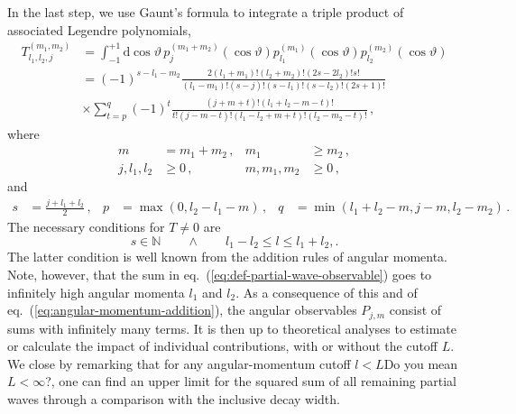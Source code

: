 \documentclass[aps,prd,reprint,nofootinbib,preprintnumbers]{revtex4}
\newcommand{\refeq}[1]{eq.~(\ref{eq:#1})}
\newcommand{\rmdx}[1]{\mbox{d} #1 \,} %
\renewcommand{\theta}{\vartheta}
\newcommand{\fred}[1]{{\color{brown!85!black}#1}}
\begin{document}
In the last step, we use Gaunt's formula \cite{Gaunt:1929} to integrate a triple product of associated Legendre polynomials,
\begin{equation}
\begin{aligned}
    T_{l_1,l_2,j}^{(m_1,m_2)}
        & = \int_{-1}^{+1} \rmdx{\cos\theta} p_{j}^{(m_1 + m_2)}(\cos\theta) p_{l_1}^{(m_1)}(\cos\theta) p_{l_2}^{(m_2)}(\cos\theta)\\
        & = (-1)^{s - l_1 - m_2} \frac{2 (l_1 + m_1)! (l_2 + m_2)! (2s - 2 l_2)! s!}{(l_1 - m_1)! (s - j)! (s - l_1)! (s - l_2)! (2s + 1)!}\\
        & \times \sum_{t=p}^q (-1)^t \frac{(j + m + t)!(l_1 + l_2 - m - t)!}{t! (j - m - t)! (l_1 - l_2 + m + t)! (l_2 - m_2 - t)!}\,,
\end{aligned}
\end{equation}
where
\begin{equation}
\begin{aligned}
    m & = m_1 + m_2\,, &
    m_1 & \geq m_2\,,  \\
    j, l_1, l_2 & \geq 0\,, &
    m, m_1, m_2 & \geq 0\,,
\end{aligned}
\end{equation}
and
\begin{equation}
\begin{aligned}
    s & = \frac{j + l_1 + l_2}{2}\,, &
    p & = \max(0, l_2 - l_1 - m)\,, &
    q & = \min(l_1 + l_2 - m, j - m, l_2 - m_2)\,.
\end{aligned}
\end{equation}
The necessary conditions for $T \neq 0$ are
\begin{equation}
    \label{eq:angular-momentum-addition}
    s \in \mathbb{N}\qquad \wedge \qquad l_1 - l_2 \leq l \leq l_1 + l_2,.
\end{equation}
The latter condition is well known from the addition rules of angular momenta. Note, however, that
the sum in \refeq{def-partial-wave-observable} goes to infinitely high angular momenta $l_1$ and $l_2$. As a consequence
of this and of \refeq{angular-momentum-addition}, the angular observables $P_{j,m}$
consist of sums with infinitely many terms. It is then up to theoretical analyses to
estimate or calculate the impact of individual contributions, with or without the cutoff $L$.
We close by remarking that for any angular-momentum cutoff $l < L$\fred{Do you mean $L < \infty$?}, one can find an upper limit for the squared sum of all remaining partial waves through a comparison with the inclusive decay
width.



\end{document}
